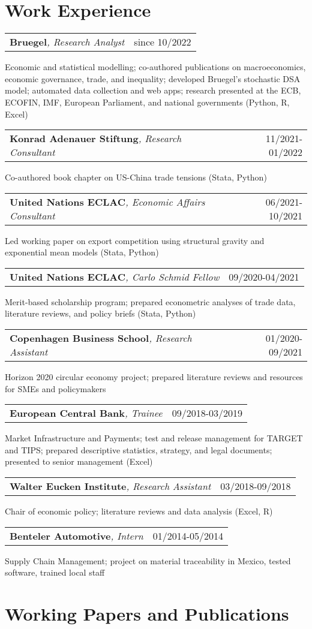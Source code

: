 \documentclass[A4,11pt]{article}
\makeatletter
\newcommand{\Subheading}[4]{   
    \begin{tabular*}{\textwidth}[t]{@{}l @{\extracolsep{\fill}} r@{}}
        \textbf{#1}\textit{\small #2} & \footnotesize #3 \\
    \end{tabular*}
    \small #4 
    \vspace{7pt}
}
\makeatother
\begin{document}
\section{Work Experience}

    \Subheading
        {Bruegel}{, Research Analyst}{since 10/2022}
        {Economic and statistical modelling; co-authored publications on macroeconomics, 
        economic governance, trade, and inequality; 
        developed Bruegel's stochastic DSA model; 
        automated data collection and web apps;
        research presented at the ECB, ECOFIN, IMF, European Parliament, and national governments 
        (Python, R, Excel)}

    \Subheading
        {Konrad Adenauer Stiftung}{, Research Consultant}{11/2021-01/2022}
        {Co-authored book chapter on US-China trade tensions 
        (Stata, Python)}  

    \Subheading
        {United Nations ECLAC}{, Economic Affairs Consultant}{06/2021-10/2021}
        {Led working paper on export competition using structural gravity 
        and exponential mean models (Stata, Python)}

    \Subheading
        {United Nations ECLAC}{, Carlo Schmid Fellow}{09/2020-04/2021}
        {Merit-based scholarship program; prepared econometric analyses of trade data, 
        literature reviews, and policy briefs (Stata, Python)}

    \Subheading
        {Copenhagen Business School}{, Research Assistant}{01/2020-09/2021}
        {Horizon 2020 circular economy project; prepared literature reviews and 
        resources for SMEs and policymakers}

    \Subheading
        {European Central Bank}{, Trainee}{09/2018-03/2019}
        {Market Infrastructure and Payments; test and release management for TARGET 
        and TIPS; prepared descriptive statistics, strategy, and legal documents;
        presented to senior management (Excel)}

    \Subheading
        {Walter Eucken Institute}{, Research Assistant}{03/2018-09/2018}
        {Chair of economic policy; literature reviews and data analysis (Excel, R)}

    \Subheading
        {Benteler Automotive}{, Intern}{01/2014-05/2014}
        {Supply Chain Management; project on material traceability in Mexico, 
        tested software, trained local staff}

\newpage

\section{Working Papers and Publications}
\setlength{}
\begin{refsection}
\nocite{*}
\printbibliography[heading=none]
\end{refsection}
\end{document}
